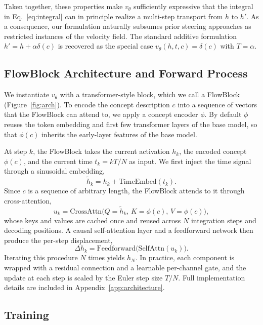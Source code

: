 \documentclass{article}
\newcommand{\vt}{v_\theta}
\begin{document}
Taken together, these properties make $\vt$ sufficiently expressive that the integral in Eq.~\ref{eq:integral} can in principle realize a multi-step transport from $h$ to $h'$. As a consequence, our formulation naturally subsumes prior steering approaches as restricted instances of the velocity field. The standard additive formulation $h' = h + \alpha \delta(c)$ is recovered as the special case $\vt(h,t,c) = \delta(c)$ with $T = \alpha$.

\subsection{FlowBlock Architecture and Forward Process}
\label{sec:architecture}

We instantiate $\vt$ with a transformer-style block, which we call a FlowBlock (Figure~\ref{fig:arch}). To encode the concept description $c$ into a sequence of vectors that the FlowBlock can attend to, we apply a concept encoder $\phi$. By default $\phi$ reuses the token embedding and first few transformer layers of the base model, so that $\phi(c)$ inherits the early-layer features of the base model.

At step $k$, the FlowBlock takes the current activation $h_k$, the encoded concept $\phi(c)$, and the current time $t_k = kT/N$ as input. We first inject the time signal through a sinusoidal embedding,
\begin{equation}
    \tilde{h}_k = h_k + \mathrm{TimeEmbed}(t_k).
\end{equation}
Since $c$ is a sequence of arbitrary length, the FlowBlock attends to it through cross-attention,
\begin{equation}
    u_k = \mathrm{CrossAttn}\bigl(Q = \tilde{h}_k,\, K = \phi(c),\, V = \phi(c)\bigr),
\end{equation}
whose keys and values are cached once and reused across $N$ integration steps and decoding positions. A causal self-attention layer and a feedforward network then produce the per-step displacement,
\begin{equation}
    \Delta h_{k} = \mathrm{Feedforward}\bigl(\mathrm{SelfAttn}(u_k)\bigr).
\end{equation}
Iterating this procedure $N$ times yields $h_N$.
In practice, each component is wrapped with a residual connection and a learnable per-channel gate, and the update at each step is scaled by the Euler step size $T/N$. Full implementation details are included in Appendix~\ref{app:architecture}.

\subsection{Training}
\label{sec:training}
\end{document}
